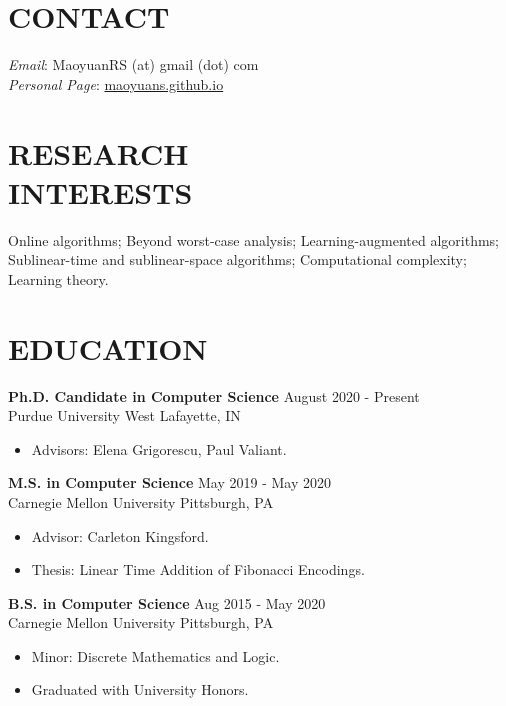 \documentclass[margin, 10pt]{res} %
\begin{document}
\begin{resume}

\section{CONTACT}
\emph{Email}: MaoyuanRS (at) gmail (dot) com\\
\emph{Personal Page}: \href{https://maoyuans.github.io}{maoyuans.github.io}

 
\section{RESEARCH \\ INTERESTS}  

Online algorithms; Beyond worst-case analysis; Learning-augmented algorithms; Sublinear-time and sublinear-space algorithms; Computational complexity; Learning theory.

 
\section{EDUCATION}

{\bf Ph.D. Candidate in Computer Science} \hfill August 2020 - Present \\
Purdue University \hfill West Lafayette, IN

\begin{itemize}
\item Advisors: Elena Grigorescu, Paul Valiant.
\end{itemize} 

{\bf M.S. in Computer Science} \hfill May 2019 - May 2020 \\
Carnegie Mellon University \hfill Pittsburgh, PA

\begin{itemize}
\item Advisor: Carleton Kingsford. \hspace{-2em}
\item Thesis: Linear Time Addition of Fibonacci Encodings.
\end{itemize} 

{\bf B.S. in Computer Science} \hfill Aug 2015 - May 2020 \\
Carnegie Mellon University \hfill Pittsburgh, PA

\begin{itemize}
\item Minor: Discrete Mathematics and Logic.
\item Graduated with University Honors.
\end{itemize} 



\end{resume}
\end{document}
